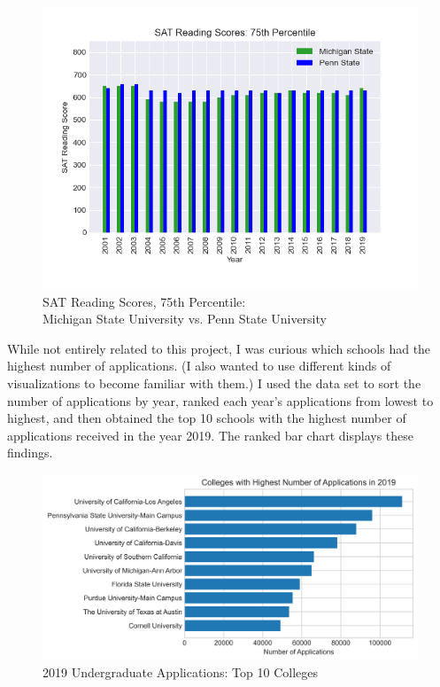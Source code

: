 \documentclass[a4paper,12pt]{article}
\begin{document}
\begin{figure}[h]
	{\centering
		\captionsetup{justification=centering}
		\includegraphics[scale=0.75]{msu_psu_read75pct.png}
		\caption{SAT Reading Scores, 75th Percentile: \\ Michigan State University vs. Penn State University}}
\end{figure}
\pagebreak

\noindent While not entirely related to this project, I was curious which schools had the highest number of applications. (I also wanted to use different kinds of visualizations to become familiar with them.) I used the data set to sort the number of applications by year, ranked each year's applications from lowest to highest, and then obtained the top 10 schools with the highest number of applications received in the year 2019. The ranked bar chart displays these findings. 

\begin{figure}[h]
	{\centering
	\captionsetup{justification=centering}
	\includegraphics[scale=0.7]{college_apps2.png}
	\caption{2019 Undergraduate Applications: Top 10 Colleges}}
\end{figure}
\end{document}
